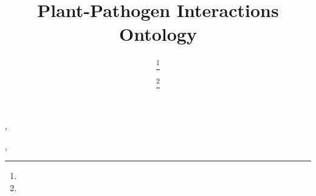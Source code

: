 \documentclass{iosart2c}
\begin{document}
\begin{frontmatter}

\title{Plant-Pathogen Interactions Ontology}
\runningtitle{}



\author{\fnms{} \snm{}\thanks{}}
\address{}
\runningauthor{}

\author[A]{ \snm{}\thanks{}},

\begin{abstract}
\end{abstract}

\begin{keyword}
 \sep
\end{keyword}

\end{frontmatter}












\begin{thebibliography}{9}



\end{thebibliography}
\end{document}
